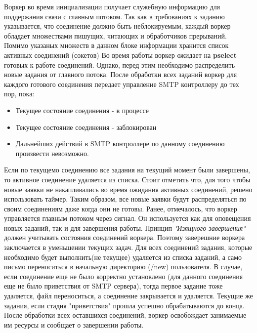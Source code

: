 \documentclass[a4paper,12pt]{report}
\begin{document}
Воркер во время инициализации получает служебную информацию для поддержания связи с главным потоком. Так как в требованиях к заданию указывается, что соединение должно быть неблокируемым, каждый воркер обладает множествами пишущих, читающих и обработчиков прерываний. Помимо указаных множеств в данном блоке информации хранится список активных соединений (сокетов)
Во время работы воркер ожидает на \textbf{pselect} готовых к работе соединений. Однако, перед этим необходимо распределить новые задания от главного потока. После обработки всех заданий воркер для каждого готового соединения передает управление SMTP контроллеру до тех пор, пока:
\begin{itemize}
    \item Текущее состояние соединения - в процессе
    \item Текущее состояние соединения - заблокирован
    \item Дальнейших действий в SMTP контроллере по данному соединению произвести невозможно.
\end{itemize} 
Если по текущемо соединению все задания на текущий момент были завершены, то активное соединение удаляется из списка. 
Стоит отметить что, для того чтобы новые заявки не накапливались во время ожидания активных соединений, решено использовать таймер. Таким образом, все новые заявки будут распределяться по своим соединениям даже когда они не готовы.
Ранее, отмечалось, что воркер управляется главным потоком через сигнал. Он используется как для оповещения новых заданий, так и для завершения работы. Принцип \textit{"Изящного завершения"} должен учитывать состояния соединений воркера. Поэтому заверешние воркера заключается в уменьшении текущих задач. Для всех соединений задания, которые необходимо будет выполнить(не текущее) удаляется из списка заданий, а само письмо переноситься в начальную директорию (/new) пользователя. В случае, если соединение еще не было корректно установлено (для данного соединения еще не было приветствия от SMTP сервера), тогда первое задание тоже удаляется, файл переноситься, а соединение закрывается и удаляется. Текущие же задания, если стадия "приветствия" прошла успешно обрабатываются до конца. После обработки всех оставшихся соединений, воркер освобождает занимаемые им ресурсы и сообщает о завершении работы.
\end{document}
